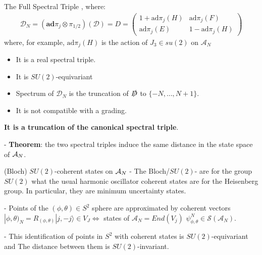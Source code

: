 \begin{frame}{The Full Spectral Triple} %
, where:
\begin{multline}
    \mathcal D_N = (\textbf{ad}\pi_j \otimes \pi_{1/2})(\mathcal D) = D = \begin{pmatrix} 1 + \text{ad}\pi_j(H) & \text{ad}\pi_j(F) \\ \text{ad}\pi_j(E) & 1 - \text{ad}\pi_j(H)\end{pmatrix} 
\end{multline}
where, for example, $\text{ad}\pi_j(H)$ is the action of $J_3 \in su(2)$ on $\mathcal A_N$

    \begin{itemize}
    
    \item It is a real spectral triple.
    
    \item It is $SU(2)$-equivariant
    
    \item Spectrum of $\mathcal D_N$ is the truncation of $\slashed D$ to $\{-N, \dots, N+1\}$.%
    
    \item It is not compatible with a grading.
    
    \end{itemize}

\textbf{It is a truncation of the canonical spectral triple}.

- \textbf{Theorem}: the two spectral triples induce the same distance in the state space of $\mathcal A_N$.
\end{frame}

\begin{frame}{(Bloch) $SU(2)$-coherent states on $\mathcal A_N$} %
- The Bloch/$SU(2)$- are for the group $SU(2)$ what the usual harmonic oscillator coherent states are for the Heisenberg group. In particular, they are minimum uncertainty states. 


- Points of the $(\phi, \theta) \in S^2$ sphere are approximated by coherent vectors $|\phi, \theta)_N = R_{(\phi, \theta)}|j, -j\rangle \in V_J \Longleftrightarrow $ states of $\mathcal A_N = End(V_j)$ $\psi^N_{\phi, \theta} \in \mathcal S(\mathcal A_N)$. 

- This identification of points in $S^2$ with coherent states is $SU(2)$-equivariant and The distance between them is $SU(2)$-invariant.

\end{frame}

